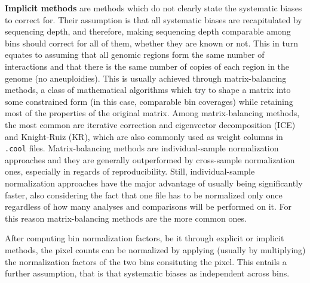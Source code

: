 \textbf{Implicit methods} are methods which do not clearly state the systematic biases to correct for. Their assumption is that all systematic biases are recapitulated by sequencing depth, and therefore, making sequencing depth comparable among bins should correct for all of them, whether they are known or not. This in turn equates to assuming that all genomic regions form the same number of interactions and that there is the same number of copies of each region in the genome (no aneuploidies). This is usually achieved through matrix-balancing methods, a class of mathematical algorithms which try to shape a matrix into some constrained form (in this case, comparable bin coverages) while retaining most of the properties of the original matrix. Among matrix-balancing methods, the most common are iterative correction and eigenvector decomposition (ICE)\cite{ice2012} and Knight-Ruiz (KR)\cite{knightruiz2012}, which are also commonly used as weight columns in \texttt{.cool} files. Matrix-balancing methods are individual-sample normalization approaches and they are generally outperformed by cross-sample normalization ones, especially in regards of reproducibility. Still, individual-sample normalization approaches have the major advantage of usually being significantly faster, also considering the fact that one file has to be normalized only once regardless of how many analyses and comparisons will be performed on it. For this reason matrix-balancing methods are the more common ones.

After computing bin normalization factors, be it through explicit or implicit methods, the pixel counts can be normalized by applying (usually by multiplying) the normalization factors of the two bins consituting the pixel. This entails a further assumption, that is that systematic biases as independent across bins.



